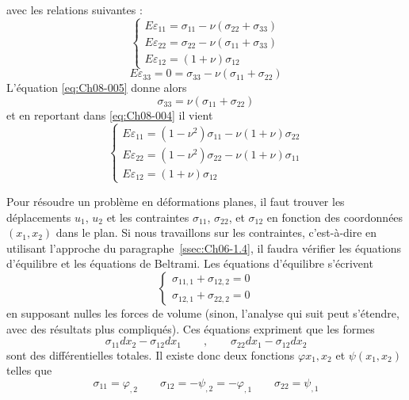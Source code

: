 avec les relations suivantes :
\begin{equation}
   \begin{cases}
     E\varepsilon_{11} = \sigma_{11}-\nu(\sigma_{22}+\sigma_{33}) \\
     E\varepsilon_{22} = \sigma_{22}-\nu(\sigma_{11}+\sigma_{33}) \\
     E\varepsilon_{12} = (1+\nu)\sigma_{12}
   \end{cases}
    \label{eq:Ch08-004}
\end{equation}
\begin{equation}
     E\varepsilon_{33} = 0 = \sigma_{33}-\nu(\sigma_{11}+\sigma_{22})
    \label{eq:Ch08-005}
\end{equation}
L'équation \eqref{eq:Ch08-005} donne alors
\begin{equation}
    \sigma_{33}=\nu(\sigma_{11}+\sigma_{22})
    \label{eq:Ch08-006}
\end{equation}
et en reportant dans \eqref{eq:Ch08-004} il vient 
\begin{equation}
   \begin{cases}
     E\varepsilon_{11} = (1-\nu^2)\sigma_{11} - \nu(1+\nu)\sigma_{22}\\
     E\varepsilon_{22} = (1-\nu^2)\sigma_{22} - \nu(1+\nu)\sigma_{11}\\
     E\varepsilon_{12} = (1+\nu)\sigma_{12}
   \end{cases}
    \label{eq:Ch08-007}
\end{equation}

Pour résoudre un problème en déformations planes, il faut trouver les déplacements $u_1$, $u_2$ et les contraintes $\sigma_{11}$, $\sigma_{22}$, et $\sigma_{12}$ en fonction des coordonnées $(x_1,x_2)$ dans le plan.
Si nous travaillons sur les contraintes, c'est-à-dire en utilisant l'approche du paragraphe~\ref{ssec:Ch06-1.4}, il faudra vérifier les équations d'équilibre et les équations de Beltrami. 
Les équations d'équilibre s'écrivent 
\begin{equation}
   \begin{cases}
     \sigma_{11,1}+\sigma_{12,2}=0\\
     \sigma_{12,1}+\sigma_{22,2}=0
   \end{cases}
    \label{eq:Ch08-008}
\end{equation}
en supposant nulles les forces de volume (sinon, l'analyse qui suit peut s'étendre, avec des résultats plus compliqués). 
Ces équations expriment que les formes 
\begin{equation*}
\sigma_{11}dx_2-\sigma_{12}dx_1 \qquad,\qquad \sigma_{22}dx_1-\sigma_{12}dx_2
\end{equation*}
sont des différentielles totales. Il existe donc deux fonctions   $\varphi{x_1,x_2}$ et $\psi(x_1,x_2)$ telles que 
\begin{equation*}
\sigma_{11}=\varphi_{,2} \qquad \sigma_{12}=-\psi_{,2}=-\varphi_{,1} \qquad \sigma_{22}=\psi_{,1}
\end{equation*}

